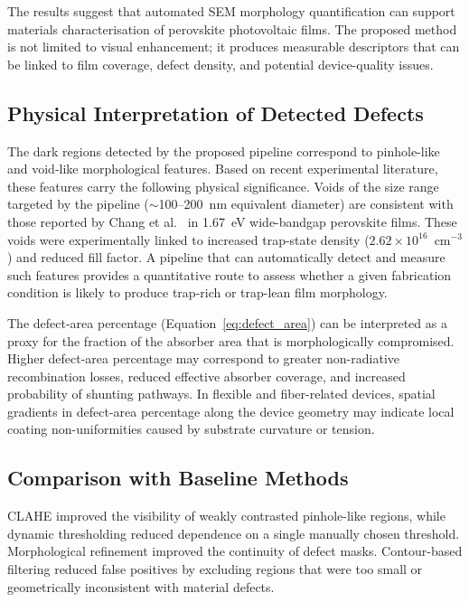 \documentclass[pdflatex,sn-mathphys-num,iicol]{sn-jnl}
\theoremstyle{thmstyleone}
\theoremstyle{thmstyletwo}
\theoremstyle{thmstylethree}
\begin{document}
The results suggest that automated SEM morphology quantification can
support materials characterisation of perovskite photovoltaic films.
The proposed method is not limited to visual enhancement; it produces
measurable descriptors that can be linked to film coverage, defect
density, and potential device-quality issues.

\subsection{Physical Interpretation of Detected Defects}

The dark regions detected by the proposed pipeline correspond to
pinhole-like and void-like morphological features. Based on recent
experimental literature, these features carry the following physical
significance. Voids of the size range targeted by the pipeline
($\sim$100--200~nm equivalent diameter) are consistent with those
reported by Chang et al.\ \cite{chang2026} in 1.67~eV wide-bandgap
perovskite films. These voids were experimentally linked to increased
trap-state density ($2.62 \times 10^{16}$~cm$^{-3}$) and reduced fill
factor. A pipeline that can automatically detect and measure such
features provides a quantitative route to assess whether a given
fabrication condition is likely to produce trap-rich or trap-lean
film morphology.

The defect-area percentage (Equation~\ref{eq:defect_area}) can be
interpreted as a proxy for the fraction of the absorber area that is
morphologically compromised. Higher defect-area percentage may
correspond to greater non-radiative recombination losses, reduced
effective absorber coverage, and increased probability of shunting
pathways. In flexible and fiber-related devices, spatial gradients in
defect-area percentage along the device geometry may indicate local
coating non-uniformities caused by substrate curvature or tension.

\subsection{Comparison with Baseline Methods}

CLAHE improved the visibility of weakly contrasted pinhole-like
regions, while dynamic thresholding reduced dependence on a single
manually chosen threshold. Morphological refinement improved the
continuity of defect masks. Contour-based filtering reduced false
positives by excluding regions that were too small or geometrically
inconsistent with material defects.
\end{document}

